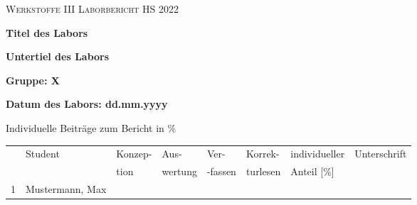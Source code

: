 %



\begin{titlepage}
	\flushleft
	{\scshape\Large Werkstoffe III \hspace{2.5cm} Laborbericht \hspace{2.5cm}HS 2022 \par}
	\vspace{6cm}
	{\huge\bfseries Titel des Labors\par}
	{\LARGE\bfseries Untertiel des Labors\par}
	\vspace{2cm}
    {\LARGE\bfseries Gruppe: X\par}
    {\LARGE\bfseries Datum des Labors: dd.mm.yyyy\par}
	\vspace{1.5cm}
	{\large Individuelle Beiträge zum Bericht in \%\par}
\begin{table}[h]
\begin{tabular}{|l|l|l|l|l|l|l|l|}\hline
   & Student           & Konzep- & Aus- & Ver- & Korrek- & individueller & Unterschrift \\
   &             &  tion & wertung & -fassen & turlesen &  Anteil {[}\%{]} & \\ \hline
   1  & Mustermann, Max   &            &                 &                   &                &                               &             \\ \hline

\end{tabular}
\end{table}
\end{titlepage}
